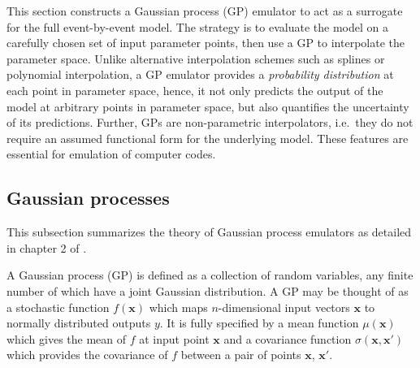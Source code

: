 \documentclass[aps,prc,reprint,superscriptaddress,amsmath]{revtex4-1}
\begin{document}
This section constructs a Gaussian process (GP) emulator to act as a surrogate for the full event-by-event model.
The strategy is to evaluate the model on a carefully chosen set of input parameter points, then use a GP to interpolate the parameter space.
Unlike alternative interpolation schemes such as splines or polynomial interpolation, a GP emulator provides a \emph{probability distribution} at each point in parameter space, hence, it not only predicts the output of the model at arbitrary points in parameter space, but also quantifies the uncertainty of its predictions.
Further, GPs are non-parametric interpolators, i.e.\ they do not require an assumed functional form for the underlying model.
These features are essential for emulation of computer codes.

\subsection{Gaussian processes}

\newcommand{\x}{\mathbf x}
\newcommand{\y}{\mathbf y}
\newcommand{\zero}{\mathbf 0}
\newcommand{\muvec}{\boldsymbol\mu}
\newcommand{\N}{\mathcal N}

This subsection summarizes the theory of Gaussian process emulators as detailed in chapter 2 of \cite{Rasmussen:2006gp}.

A Gaussian process (GP) is defined as a collection of random variables, any finite number of which have a joint Gaussian distribution.
A GP may be thought of as a stochastic function $f(\x)$ which maps $n$-dimensional input vectors $\x$ to normally distributed outputs $y$.
It is fully specified by a mean function $\mu(\x)$ which gives the mean of $f$ at input point $\x$ and a covariance function $\sigma(\x, \x')$ which provides the covariance of $f$ between a pair of points $\x$, $\x'$.
\end{document}

